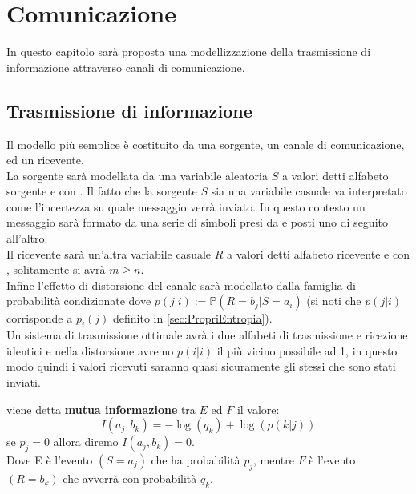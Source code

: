 \chapter{Comunicazione}
\vspace{15pt}

In questo capitolo sarà proposta una modellizzazione della trasmissione di informazione attraverso canali di comunicazione. 

\vspace{15pt}


\section{Trasmissione di informazione}
\label{sec:Trasmissione}
\vspace{10pt}


Il modello più semplice è costituito da una sorgente, un canale di comunicazione, ed un ricevente.\\
La sorgente sarà modellata da una variabile aleatoria $S$ a valori \va detti alfabeto sorgente e con \lep. Il fatto che la sorgente $S$ sia una variabile casuale va interpretato come l'incertezza su quale messaggio verrà inviato. In questo contesto un messaggio sarà formato da una serie di simboli presi da \va e posti uno di seguito all'altro.\\
Il ricevente sarà un'altra variabile casuale $R$ a valori \vb  detti alfabeto ricevente e con \leggeq, solitamente si avrà $m \geq n$.\\
Infine l'effetto di distorsione del canale sarà modellato dalla famiglia di probabilità condizionate \lepc  dove $p(j|i):= \mathbb{P}(R=b_j|S=a_i)$ (si noti che $p(j|i)$ corrisponde a $p_i(j)$ definito in \ref{sec:PropriEntropia}).\\
Un sistema di trasmissione ottimale avrà i due alfabeti di trasmissione e ricezione identici e nella distorsione avremo $p(i|i)$ il più vicino possibile ad 1, in questo modo quindi i valori ricevuti saranno quasi sicuramente gli stessi che sono stati inviati.\\
\begin{defi}
viene detta \textbf{mutua informazione}  tra $E$ ed $F$ il valore:
\begin{equation}
I(a_j,b_k)=- \log(q_k)+ \log(p(k|j))
\end{equation}
se $p_j=0$ allora diremo $I(a_j,b_k)=0$.\\
Dove E è l'evento $(S=a_j)$ che ha probabilità $p_j$, mentre $F$ è l'evento $(R=b_k)$ che avverrà con probabilità $q_k$.
\end{defi}
